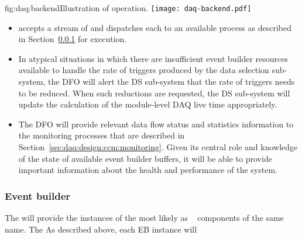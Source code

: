 
\begin{dunefigure}{fig:daq:backend}{Illustration of   operation.}
  \texttt{[image: daq-backend.pdf]}
\end{dunefigure}

\begin{itemize}
\item {} accepts a stream of  and dispatches each to an available  process as described in Section~\ref{sec:fd-daq:design-event-builder} for execution.
\item In atypical situations in which there are insufficient event builder resources available to handle the rate of triggers produced by the data selection sub-system, the DFO will alert the DS sub-system that the rate of triggers needs to be reduced.  When such reductions are requested, the DS sub-system will update the calculation of the module-level DAQ live time appropriately.
\item The DFO will provide relevant data flow status and statistics information to the monitoring processes that are described in Section~\ref{sec:daq:design:ccm:monitoring}. Given its central role and knowledge of the state of available event builder buffers, it will be able to provide important information about the health and performance of the system.
\end{itemize}

\subsubsection{Event builder}
\label{sec:fd-daq:design-event-builder}

The  will provide the instances of the  most likely as
~\cite{artdaq} components of the same name. The 
As described above, each EB instance will

